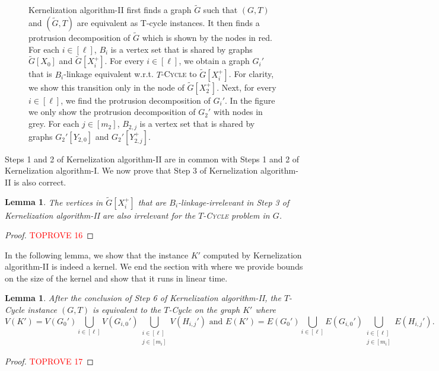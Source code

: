 \documentclass{article}
\newtheorem{lemma}[theorem]{Lemma}
\numberwithin{claimcounter}{lemma}
\newcommand{\tcycle}{$T$-\textsc{Cycle}\xspace}
\begin{document}
\begin{figure}[!htb]
{\begin{tikzpicture}
\end{tikzpicture}
}
    \caption{{\sc Kernelization algorithm-II} first finds a graph $\tilde{G}$ such that $(G,T)$ and $(\tilde{G},T)$ are equivalent as T-cycle instances. It then finds a protrusion decomposition of $\tilde{G}$ which is shown by the nodes in red. For each $i \in [\ell]$, $B_i$ is a vertex set that is shared by graphs $\tilde{G}[X_0]$ and $\tilde{G}[X_i^+]$. For every $i\in [\ell]$, we  obtain a graph $G_i'$  that is  $B_i$-linkage equivalent w.r.t. \tcycle to $\tilde{G}[X_i^+]$. For clarity, we show this transition only in the node of $\tilde{G}[X_2^+]$. Next, for every $i\in [\ell]$, we find the protrusion decomposition of $G_i'$. In the figure we only show the protrusion decomposition of $G_2'$ with nodes in grey. For each $j \in [m_2]$, $B_{2,j}$ is a vertex set that is shared by graphs $G_2'[Y_{2,0}]$ and $G_2'[Y_{2,j}^+]$.} \label{fig:kerneltwo}
\end{figure}

Steps 1 and 2 of {\sc Kernelization algorithm-II} are in common with Steps 1 and 2 of  {\sc Kernelization algorithm-I}. We now prove that Step 3 of {\sc Kernelization algorithm-II} is also correct.

\begin{lemma} \label{lem:linkirrelevant}
       The vertices in $\tilde{G}[X_i^+]$ that are $B_i$-linkage-irrelevant in Step 3 of {\sc Kernelization algorithm-II} are also irrelevant for the \tcycle problem in $G$. 
\end{lemma}
\begin{proof}\textcolor{red}{TOPROVE 16}\end{proof}

In the following lemma, we show that the instance $K'$ computed by {\sc Kernelization algorithm-II} is indeed a kernel. We end the section with  where we provide bounds on the size of the kernel and show that it runs in linear time. 

\begin{lemma} \label{lem:intercorrect}
       After the conclusion of Step 6 of {\sc Kernelization algorithm-II}, the {\sc $T$-Cycle} instance $(G,T)$ is equivalent to the {\sc $T$-Cycle} on the graph $K'$  where 
    \[ V(K') = V(G_0') \bigcup_{i\in [\ell]} V(G_{i,0}') \bigcup_{\substack{i\in [\ell] \\ j\in [m_i]}} V(H_{i,j}') \text{ and }  E(K') = E(G_0') \bigcup_{i\in [\ell]} E(G_{i,0}') \bigcup_{\substack{i\in [\ell] \\ j\in [m_i]}} E(H_{i,j}'). \] 
\end{lemma}
\begin{proof}\textcolor{red}{TOPROVE 17}\end{proof}
\end{document}
